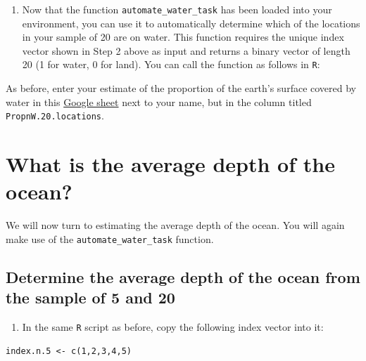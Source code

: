 \documentclass[letterpaper,9pt,twoside,printwatermark=false]{pinp}
\providecommand{\tightlist}{%
  \setlength{\itemsep}{0pt}\setlength{\parskip}{0pt}}
\begin{document}
\begin{enumerate}
\def\labelenumi{\arabic{enumi}.}
\setcounter{enumi}{3}
\tightlist
\item
  Now that the function \texttt{automate\_water\_task} has been loaded
  into your environment, you can use it to automatically determine which
  of the locations in your sample of 20 are on water. This function
  requires the unique index vector shown in Step 2 above as input and
  returns a binary vector of length 20 (1 for water, 0 for land). You
  can call the function as follows in \texttt{R}:
\end{enumerate}

\begin{Shaded}
\begin{Highlighting}[]
\StringTok{ }\NormalTok{(}\NormalTok{)}
\end{Highlighting}
\end{Shaded}

As before, enter your estimate of the proportion of the earth's surface
covered by water in this
\href{https://docs.google.com/spreadsheets/d/1Mnxeq9nQcTdQycZ7S_62fYFiNC5_a3fibsyodzfwO58/edit?usp=sharing}{Google
sheet} next to your name, but in the column titled
\texttt{PropnW.20.locations}.

\section{What is the average depth of the
ocean?}\label{what-is-the-average-depth-of-the-ocean}

We will now turn to estimating the average depth of the ocean. You will
again make use of the \texttt{automate\_water\_task} function.

\subsection{Determine the average depth of the ocean from the sample of
5 and
20}\label{determine-the-average-depth-of-the-ocean-from-the-sample-of-5-and-20}

\begin{enumerate}
\def\labelenumi{\arabic{enumi}.}
\tightlist
\item
  In the same \texttt{R} script as before, copy the following index
  vector into it:
\end{enumerate}

\begin{ShadedResult}
\begin{verbatim}
index.n.5 <- c(1,2,3,4,5)
\end{verbatim}
\end{ShadedResult}
\end{document}
